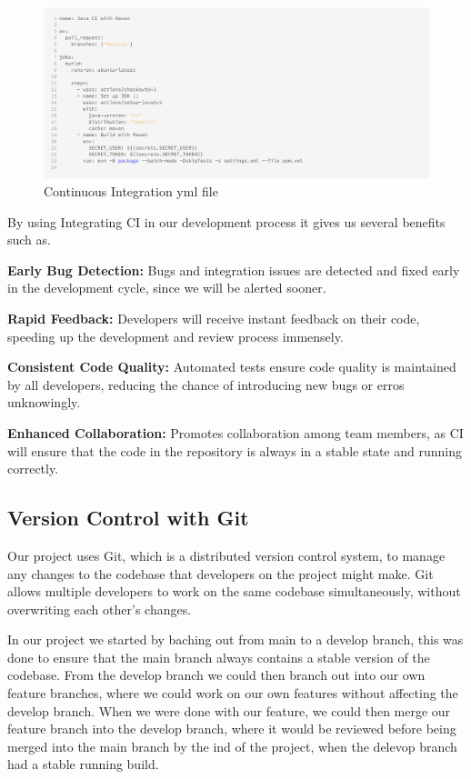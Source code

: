 \begin{figure}[H]
    \centering
    \includegraphics[width=\linewidth]{pic/Continuous Integration yml file.png}
    \caption{Continuous Integration yml file}
    \label{fig:Continuous Integration yml file}
\end{figure}

By using Integrating CI in our development process it gives us several benefits such as.

\textbf{Early Bug Detection:} Bugs and integration issues are detected and fixed early in the development cycle, since we will be alerted sooner.

\textbf{Rapid Feedback:} Developers will receive instant feedback on their code, speeding up the development and review process immensely.

\textbf{Consistent Code Quality:} Automated tests ensure code quality is maintained by all developers, reducing the chance of introducing new bugs or erros unknowingly.

\textbf{Enhanced Collaboration:} Promotes collaboration among team members, as CI will ensure that the code in the repository is always in a stable state and running correctly.

\subsection{Version Control with Git}

Our project uses Git, which is a distributed version control system, to manage any changes to the codebase that developers on the project might make.
Git allows multiple developers to work on the same codebase simultaneously, without overwriting each other's changes.

In our project we started by baching out from main to a develop branch, this was done to ensure that the main branch always contains a stable version of the codebase. From the develop branch we could then branch out into our
own feature branches, where we could work on our own features without affecting the develop branch. When we were done with our feature, we could then merge our feature branch
into the develop branch, where it would be reviewed before being merged into the main branch by the ind of the project, when the delevop branch had a stable running build.